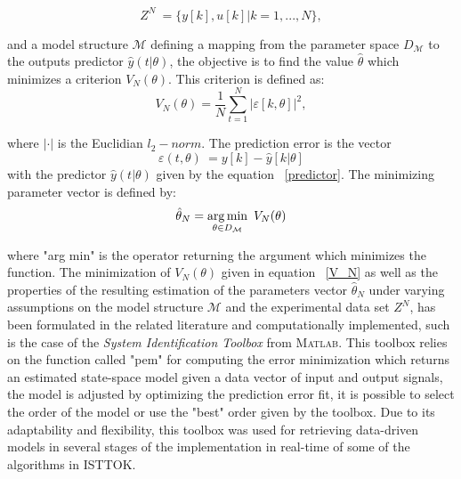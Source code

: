 \begin{equation}
Z^N~= \{y[k],u[k]|k=1,...,N\}, 
\end{equation}
 
 and a model structure $\mathcal{M}$ defining  a mapping from the parameter space $D_{\mathcal{M}}$ to the outputs predictor $\hat{y}(t|\theta)$, the objective is to find the value $\hat{\theta}$ which minimizes a criterion $V_N(\theta)$. This criterion is defined as:
 \begin{equation}
 V_N(\theta)=\frac{1}{N} \sum_{t=1}^{N}|\varepsilon[k,\theta]|^2,
 \label{V_N}
 \end{equation}
 
 where $|\cdot|$ is the Euclidian $l_2-norm$. The prediction error is the vector
 \begin{equation}
 \varepsilon(t,\theta)~=y[k]-\hat{y}[k|\theta]
 \end{equation}
 with the predictor $\hat{y}(t|\theta)$ given by the equation ~\ref{predictor}. The minimizing parameter vector is defined by:
 \begin{equation}
 \hat{\theta}_N=\operatorname*{arg\,min}_{\theta \in D_\mathcal{M}}~V_N(\theta)
 \end{equation}
 
where "arg min" is the operator returning the argument which minimizes the function. The minimization of $V_N(\theta)$ given in equation ~\ref{V_N}  as well as the properties of the resulting estimation of the parameters vector $\hat{\theta}_N$ under varying assumptions on the model structure $\mathcal{M}$ and the experimental data set $Z^N$, has been formulated in the related literature and computationally implemented, such is the case of the \textit{System Identification Toolbox} from \textsc{Matlab}. This toolbox relies on the function called "pem" for computing the error minimization which returns an estimated state-space model given a data vector of input and output signals\cite[Chapter~4]{Toolbox}, the model is adjusted by optimizing the prediction error fit, it is possible to select the order of the model or use the "best" order given by the toolbox. Due to its adaptability and flexibility, this toolbox was used for retrieving data-driven models in several stages of the implementation in real-time of some of the algorithms in ISTTOK.